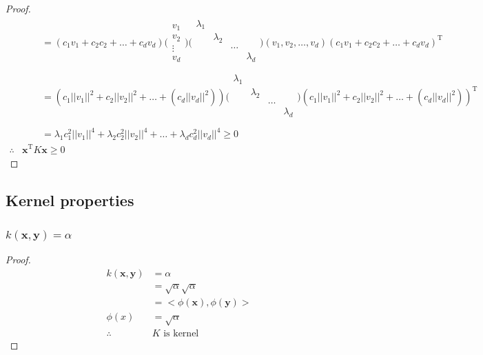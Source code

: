 \documentclass[a4paper]{article}
\begin{document}
\begin{proof}
\begin{align*}
        &\quad\quad=(c_1v_1+c_2c_2+\dots+c_dv_d)\bigl(\begin{smallmatrix} v_1\\v_2\\\vdots\\v_d\end{smallmatrix}\bigr)\bigl(\begin{smallmatrix} \lambda_1 &  &  &\\\  & \lambda_2 &  &\\  &  & \dots &\\  &  &  & \lambda_d\\\end{smallmatrix}\bigr)(v_1,v_2,\dots,v_d)(c_1v_1+c_2c_2+\dots+c_dv_d)^\mathrm{T}\\
        &\quad\quad=(c_1||v_1||^2+c_2||v_2||^2+\dots+(c_d||v_d||^2))\bigl(\begin{smallmatrix} \lambda_1 &  &  &\\\  & \lambda_2 &  &\\  &  & \dots &\\  &  &  & \lambda_d\\\end{smallmatrix}\bigr)(c_1||v_1||^2+c_2||v_2||^2+\dots+(c_d||v_d||^2))^\mathrm{T}\\
        &\quad\quad=\lambda_1c_1^2||v_1||^4+\lambda_2c_2^2||v_2||^4+\dots+\lambda_dc_d^2||v_d||^4\ge0\\
        \therefore&\mathbf{x}^\mathrm{T}K\mathbf{x}\ge0
    \end{align*}
\end{proof}

\subsection{Kernel properties}

\subsubsection{$k(\mathbf{x},\mathbf{y})=\alpha$}

\begin{proof}
    \begin{align*}
        k(\mathbf{x},\mathbf{y})&=\alpha\\
        &=\sqrt{\alpha}\sqrt{\alpha}\\
        &=<\phi(\mathbf{x}),\phi(\mathbf{y})>\\
        \phi(x)&=\sqrt{\alpha}\\
        \therefore&K\text{ is kernel}
    \end{align*}
\end{proof}
\end{document}
